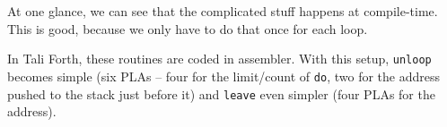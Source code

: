 At one glance, we can see that the complicated stuff happens at compile-time.
This is good, because we only have to do that once for each loop. 

In Tali Forth, these routines are coded in assembler. With this setup,
\texttt{unloop} becomes simple (six PLAs -- four for the limit/count of
\texttt{do}, two for the address pushed to the stack just before it) and
\texttt{leave} even simpler (four PLAs for the address). 

